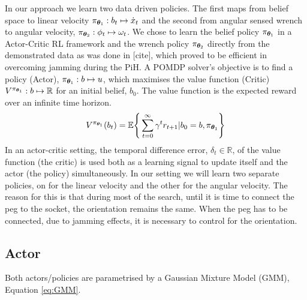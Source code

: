 In our approach we learn two data driven policies. The first maps from belief space 
to linear velocity $\pi_{\boldsymbol{\theta}_1} : b_t \mapsto \dot{x}_t$ and the second from 
angular sensed wrench to angular velocity, $ \pi_{\boldsymbol{\theta}_2} : \phi_t \mapsto \omega_t$.
We chose to learn the belief policy $\pi_{\boldsymbol{\theta}_1}$ in a Actor-Critic RL framework 
and the wrench policy $\pi_{\boldsymbol{\theta}_2}$ directly from the demonstrated data as was done 
in [cite], which proved to be efficient in overcoming jamming during the PiH. 
A POMDP solver's objective is to find a policy (Actor), $\pi_{\boldsymbol{\theta}_1}: b \mapsto u$, which maximises 
the value function (Critic) $V^{\pi_{\boldsymbol{\theta}_1}} : b \mapsto \mathbb{R}$ for an initial belief, $b_{0}$. The value function
is the expected reward over an infinite time horizon.
\begin{equation}\label{eq:value_function}
  V^{\pi_{\boldsymbol{\theta}_1}}(b_t) = \mathbb{E}\Bigg\{ \sum_{t=0}^{\infty} \gamma^{t} r_{t+1} | b_0=b,\pi_{\boldsymbol{\theta}_1}\Bigg\}
\end{equation}
In an actor-critic setting, the temporal difference error, $\delta_t \in \mathbb{R}$, of the value function (the critic) is used both 
as a learning signal to update itself and the actor (the policy) simultaneously. In our setting we will 
learn two separate policies, on for the linear velocity and the other for the angular velocity. 
The reason for this is that during most of the search, until it is time to connect the peg to the socket,
the orientation remains the same. When the peg has to be connected, due to jamming effects, it is necessary 
to control for the orientation. 

\subsection{Actor}
Both actors/policies are parametrised by a Gaussian Mixture Model (GMM), Equation \ref{eq:GMM}.

